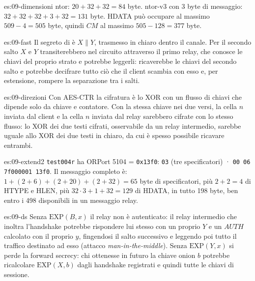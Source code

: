 \begin{soluzione}{es:09-dimensioni}
ntor: $20 + 32 + 32 = 84$ byte. ntor-v3 con 3 byte di messaggio: $32 + 32 + 32 + 3 + 32 = 131$ byte. HDATA può occupare al massimo $509 - 4 = 505$ byte, quindi $CM$ al massimo $505 - 128 = 377$ byte.
\end{soluzione}

\begin{soluzione}{es:09-fast}
Il segreto di  è $X \| Y$, trasmesso in chiaro dentro il canale. Per il secondo salto $X$ e $Y$ transiterebbero nel circuito attraverso il primo relay, che conosce le chiavi del proprio strato e potrebbe leggerli: ricaverebbe le chiavi del secondo salto e potrebbe decifrare tutto ciò che il client scambia con esso e, per estensione, rompere la separazione tra i salti.
\end{soluzione}

\begin{soluzione}{es:09-direzioni}
Con AES-CTR la cifratura è lo XOR con un flusso di chiavi che dipende solo da chiave e contatore. Con la stessa chiave nei due versi, la cella $n$ inviata dal client e la cella $n$ inviata dal relay sarebbero cifrate con lo stesso flusso: lo XOR dei due testi cifrati, osservabile da un relay intermedio, sarebbe uguale allo XOR dei due testi in chiaro, da cui è spesso possibile ricavare entrambi.
\end{soluzione}

\begin{soluzione}{es:09-extend2}
\texttt{test004r} ha ORPort 5104 = \texttt{0x13f0}: \texttt{03} (tre specificatori) · \texttt{00 06 7f000001 13f0}. Il messaggio completo è: $1 + (2+6) + (2+20) + (2+32) = 65$ byte di specificatori, più $2 + 2 = 4$ di HTYPE e HLEN, più $32 \cdot 3 + 1 + 32 = 129$ di HDATA, in tutto 198 byte, ben entro i 498 disponibili in un messaggio relay.
\end{soluzione}

\begin{soluzione}{es:09-ds}
Senza $\mathrm{EXP}(B, x)$ il relay non è autenticato: il relay intermedio che inoltra l'handshake potrebbe rispondere lui stesso con un proprio $Y$ e un $\mathit{AUTH}$ calcolato con il proprio $y$, fingendosi il salto successivo e leggendo poi tutto il traffico destinato ad esso (attacco \emph{man-in-the-middle}). Senza $\mathrm{EXP}(Y, x)$ si perde la forward secrecy: chi ottenesse in futuro la chiave onion $b$ potrebbe ricalcolare $\mathrm{EXP}(X, b)$ dagli handshake registrati e quindi tutte le chiavi di sessione.
\end{soluzione}

